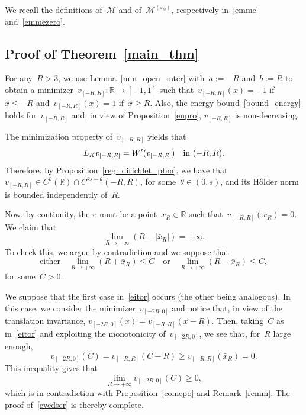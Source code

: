 \documentclass[10pt,a4paper]{amsart}
\numberwithin{equation}{section}
\newcommand{\R}{\mathbb{R}}
\begin{document}
We recall the definitions of~$\mathscr{M}$ and of~$\mathscr{M}^{(x_0)}$, respectively in~\eqref{emme} and~\eqref{emmezero}.
    
     \subsection*{Proof of Theorem~\ref{main_thm}} 
For any~$R>3$, we use Lemma~\ref{min_open_inter} with~$a:=-R$ and~$b:=R$ to obtain a minimizer~$v_{[-R,R]}: \R \to [-1,1]$ such that~$v_{[-R,R]}(x) = -1$ if~$x\leq-R$ and~$v_{[-R,R]}(x)=1$ if~$x \geq R$. Also, the energy bound~\eqref{bound_energy} holds for~$v_{[-R,R]}$ and, in view of Proposition~\ref{eupro}, $v_{[-R,R]}$ is non-decreasing.

The minimization property of~$v_{[-R,R]}$ yields that
\begin{equation*}
{L}_K v_{[-R,R]} = W\rq{}(v_{[-R,R]}) \quad\mbox{in }  (-R,R).
\end{equation*}
Therefore, by Proposition~\ref{reg_dirichlet_pbm}, we have that~$v_{[-R,R]} \in C^{\theta}(\R) \cap C^{2s+\theta}(-R,R)$, for some~$\theta \in (0,s)$, and its  H\"{o}lder norm is bounded independently of~$R$.

Now, by continuity, there must be a point~$\bar{x}_R\in\R$ such that~$v_{[-R,R]}(\bar{x}_R)=0$. We claim that
\begin{equation}\label{evedser}
\lim_{R \to +\infty}( R- |\bar{x}_R|)= +\infty.
\end{equation}
To check this, we argue by contradiction and we suppose that
\begin{equation}\label{eitor}
\text{either}\quad \lim_{R \to +\infty} ( R+ \bar{x}_R) \leq C \quad\mbox{or}\quad \lim_{R \to +\infty} ( R - \bar{x}_R) \leq C,
\end{equation}
for some~$C>0$. 

We suppose that
the first case in~\eqref{eitor} occurs (the other being analogous).
In this case, we consider the minimizer~$v_{[-2R,0]}$ and notice that, in view of the translation invariance, $v_{[-2R,0]}(x)=v_{[-R,R]}(x-R)$. Then, taking~$C$ as in~\eqref{eitor} and exploiting the monotonicity of~$v_{[-2R,0]}$, we see that, for~$R$ large enough,
\begin{equation*}
v_{[-2R,0]}(C)= v_{[-R,R]}(C - R) \geq v_{[-R,R]}(\bar{x}_R) =0 . 
\end{equation*}
This inequality gives that
\begin{equation*}
\lim_{R \to +\infty} v_{[-2R,0]}(C) \geq 0,
\end{equation*}
which is in contradiction with Proposition~\ref{comepo} and Remark~\ref{remm}. The proof of~\eqref{evedser} is thereby complete.
\end{document}
